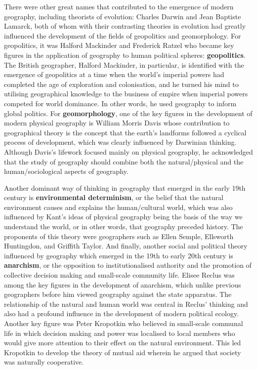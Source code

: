 \documentclass[a4paper, 10.5pt]{article} %
\begin{document}
There were other great names that contributed to the emergence of modern geography, including theorists of evolution: Charles Darwin and Jean Baptiste Lamarck, both of whom with their contrasting theories in evolution had greatly influenced the development of the fields of geopolitics and geomorphology. For geopolitics, it was Halford Mackinder and Frederick Ratzel who became key figures in the application of geography to human political spheres: \textbf{geopolitics}. The British geographer, Halford Mackinder, in particular, is identified with the emergence of geopolitics at a time when the world's imperial powers had completed the age of exploration and colonisation, and he turned his mind to utilising geographical knowledge to the business of empire when imperial powers competed for world dominance. In other words, he used geography to inform global politics. For \textbf{geomorphology}, one of the key figures in the development of modern physical geography is William Morris Davis whose contribution to geographical theory is the concept that the earth's landforms followed a cyclical process of development, which was clearly influenced by Darwinian thinking. Although Davis's lifework focused mainly on physical geography, he acknowledged that the study of geography should combine both the natural/physical and the human/sociological aspects of geography.

Another dominant way of thinking in geography that emerged in the early 19th century is \textbf{environmental determinism}, or the belief that the natural environment causes and explains the human/cultural world, which was also influenced by Kant's ideas of physical geography being the basis of the way we understand the world, or in other words, that geography preceded history. The proponents of this theory were geographers such as Ellen Semple, Ellsworth Huntingdon, and Griffith Taylor. And finally, another social and political theory influenced by geography which emerged in the 19th to early 20th century is \textbf{anarchism}, or the opposition to institutionalised authority and the promotion of collective decision making and small-scale community life. Elisee Reclus was among the key figures in the development of anarchism, which unlike previous geographers before him viewed geography against the state apparatus. The relationship of the natural and human world was central in Reclus' thinking and also had a profound influence in the development of modern political ecology. Another key figure was Peter Kropotkin who believed in small-scale communal life in which decision making and power was localised to local members who would give more attention to their effect on the natural environment. This led Kropotkin to develop the theory of mutual aid wherein he argued that society was naturally cooperative.
\end{document}
